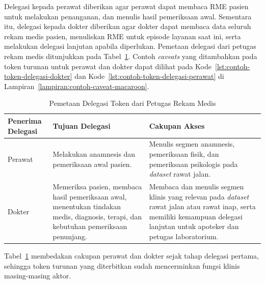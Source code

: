 Delegasi kepada perawat diberikan agar perawat dapat membaca RME pasien untuk melakukan penanganan, dan menulis hasil pemeriksaan awal. Sementara itu, delegasi kepada dokter diberikan agar dokter dapat membaca data seluruh rekam medis pasien, menuliskan RME untuk episode layanan saat ini, serta melakukan delegasi lanjutan apabila diperlukan. Pemetaan delegasi dari petugas rekam medis ditunjukkan pada Tabel~\ref{tab:pemetaan-delegasi-rekam-medis}. Contoh \textit{caveats} yang ditambahkan pada token turunan untuk perawat dan dokter dapat dilihat pada Kode~\ref{lst:contoh-token-delegasi-dokter} dan Kode~\ref{lst:contoh-token-delegasi-perawat} di Lampiran~\ref{lampiran:contoh-caveat-macaroon}.

\begin{table}[H]
	\centering
	\caption{Pemetaan Delegasi Token dari Petugas Rekam Medis}
	\label{tab:pemetaan-delegasi-rekam-medis}
	\small
	\begin{tabular}{|p{}|p{}|p{}|}
		\hline
		\textbf{Penerima Delegasi} & \textbf{Tujuan Delegasi}                                                                                                                                                              & \textbf{Cakupan Akses} \\ \hline

		Perawat
		                           & Melakukan anamnesis dan pemeriksaan awal pasien.
		                           & Menulis segmen anamnesis, pemeriksaan fisik, dan pemeriksaan psikologis pada \textit{dataset} rawat jalan.                                                                                                     \\ \hline

		Dokter
		                           & Memeriksa pasien, membaca hasil pemeriksaan awal, menentukan tindakan medis, diagnosis, terapi, dan kebutuhan pemeriksaan penunjang.
		                           & Membaca dan menulis segmen klinis yang relevan pada \textit{dataset} rawat jalan atau rawat inap, serta memiliki kemampuan delegasi lanjutan untuk apoteker dan petugas laboratorium.                          \\ \hline
	\end{tabular}
\end{table}

Tabel~\ref{tab:pemetaan-delegasi-rekam-medis} membedakan cakupan perawat dan dokter sejak tahap delegasi pertama, sehingga token turunan yang diterbitkan sudah mencerminkan fungsi klinis masing-masing aktor.

